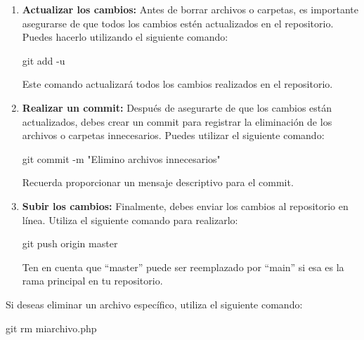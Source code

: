 \documentclass[
  letterpaper,
  DIV=11,
  numbers=noendperiod]{scrartcl}
\newenvironment{Shaded}{}{}
\newcommand{\AttributeTok}[1]{\textcolor[rgb]{0.84,0.23,0.29}{#1}}
\newcommand{\FunctionTok}[1]{\textcolor[rgb]{0.44,0.26,0.76}{#1}}
\newcommand{\NormalTok}[1]{\textcolor[rgb]{0.14,0.16,0.18}{#1}}
\newcommand{\StringTok}[1]{\textcolor[rgb]{0.01,0.18,0.38}{#1}}
\begin{document}
\begin{enumerate}
\def\labelenumi{\arabic{enumi}.}
\item
  \textbf{Actualizar los cambios:} Antes de borrar archivos o carpetas,
  es importante asegurarse de que todos los cambios estén actualizados
  en el repositorio. Puedes hacerlo utilizando el siguiente comando:

\begin{Shaded}
\begin{Highlighting}[]
\FunctionTok{git}\NormalTok{ add }\AttributeTok{{-}u}
\end{Highlighting}
\end{Shaded}

  Este comando actualizará todos los cambios realizados en el
  repositorio.
\item
  \textbf{Realizar un commit:} Después de asegurarte de que los cambios
  están actualizados, debes crear un commit para registrar la
  eliminación de los archivos o carpetas innecesarios. Puedes utilizar
  el siguiente comando:

\begin{Shaded}
\begin{Highlighting}[]
\FunctionTok{git}\NormalTok{ commit }\AttributeTok{{-}m} \StringTok{"Elimino archivos innecesarios"}
\end{Highlighting}
\end{Shaded}

  Recuerda proporcionar un mensaje descriptivo para el commit.
\item
  \textbf{Subir los cambios:} Finalmente, debes enviar los cambios al
  repositorio en línea. Utiliza el siguiente comando para realizarlo:

\begin{Shaded}
\begin{Highlighting}[]
\FunctionTok{git}\NormalTok{ push origin master}
\end{Highlighting}
\end{Shaded}

  Ten en cuenta que ``master'' puede ser reemplazado por ``main'' si esa
  es la rama principal en tu repositorio.
\end{enumerate}

Si deseas eliminar un archivo específico, utiliza el siguiente comando:

\begin{Shaded}
\begin{Highlighting}[]
\FunctionTok{git}\NormalTok{ rm miarchivo.php}
\end{Highlighting}
\end{Shaded}
\end{document}
